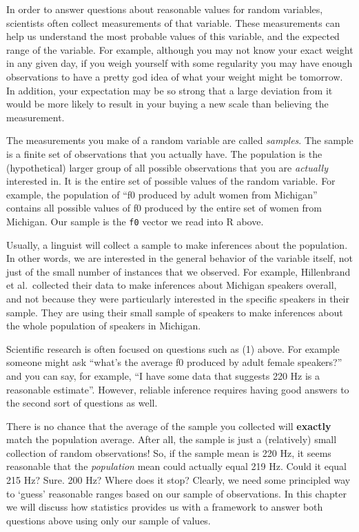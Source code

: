 \documentclass[
]{book}
\begin{document}
In order to answer questions about reasonable values for random variables, scientists often collect measurements of that variable. These measurements can help us understand the most probable values of this variable, and the expected range of the variable. For example, although you may not know your exact weight in any given day, if you weigh yourself with some regularity you may have enough observations to have a pretty god idea of what your weight might be tomorrow. In addition, your expectation may be so strong that a large deviation from it would be more likely to result in your buying a new scale than believing the measurement.

The measurements you make of a random variable are called \emph{samples}. The sample is a finite set of observations that you actually have. The population is the (hypothetical) larger group of all possible observations that you are \emph{actually} interested in. It is the entire set of possible values of the random variable. For example, the population of ``f0 produced by adult women from Michigan'' contains all possible values of f0 produced by the entire set of women from Michigan. Our sample is the \texttt{f0} vector we read into R above.

Usually, a linguist will collect a sample to make inferences about the population. In other words, we are interested in the general behavior of the variable itself, not just of the small number of instances that we observed. For example, Hillenbrand et al.~collected their data to make inferences about Michigan speakers overall, and not because they were particularly interested in the specific speakers in their sample. They are using their small sample of speakers to make inferences about the whole population of speakers in Michigan.

Scientific research is often focused on questions such as (1) above. For example someone might ask ``what's the average f0 produced by adult female speakers?'' and you can say, for example, ``I have some data that suggests 220 Hz is a reasonable estimate''. However, reliable inference requires having good answers to the second sort of questions as well.

There is no chance that the average of the sample you collected will \textbf{exactly} match the population average. After all, the sample is just a (relatively) small collection of random observations! So, if the sample mean is 220 Hz, it seems reasonable that the \emph{population} mean could actually equal 219 Hz. Could it equal 215 Hz? Sure. 200 Hz? Where does it stop? Clearly, we need some principled way to `guess' reasonable ranges based on our sample of observations. In this chapter we will discuss how statistics provides us with a framework to answer both questions above using only our sample of values.
\end{document}
